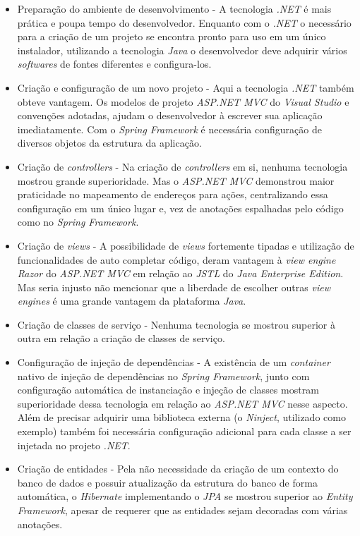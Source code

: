 \documentclass[a4paper,12pt]{article}
\newcommand{\est}[1] {
\textit{#1}}
\newcommand{\sigla}[1] {
\textit{#1}}
\newcommand{\lang}[1] {
\textit{#1}}
\begin{document}
\begin{itemize}
  \item Preparação do ambiente de desenvolvimento - A tecnologia \sigla{.NET} é mais prática e poupa tempo do desenvolvedor. Enquanto com o \sigla{.NET} o necessário para a criação de um projeto se encontra pronto para uso em um único instalador, utilizando a tecnologia \lang{Java} o desenvolvedor deve adquirir vários \est{softwares} de fontes diferentes e configura-los.
  \item Criação e configuração de um novo projeto - Aqui a tecnologia \sigla{.NET} também obteve vantagem. Os modelos de projeto \est{ASP.NET MVC} do \est{Visual Studio} e convenções adotadas, ajudam o desenvolvedor à escrever sua aplicação imediatamente. Com o \est{Spring Framework} é necessária configuração de diversos objetos da estrutura da aplicação.
  \item Criação de \est{controllers} - Na criação de \est{controllers} em si, nenhuma tecnologia mostrou grande superioridade. Mas o \est{ASP.NET MVC} demonstrou maior praticidade no mapeamento de endereços para ações, centralizando essa configuração em um único lugar e, vez de anotações espalhadas pelo código como no \est{Spring Framework}.
  \item Criação de \est{views} - A possibilidade de \est{views} fortemente tipadas e utilização de funcionalidades de auto completar código, deram vantagem à \est{view engine Razor} do \est{ASP.NET MVC} em relação ao \sigla{JSTL} do \est{Java Enterprise Edition}. Mas seria injusto não mencionar que a liberdade de escolher outras \est{view engines} é uma grande vantagem da plataforma \lang{Java}.
  \item Criação de classes de serviço - Nenhuma tecnologia se mostrou superior à outra em relação a criação de classes de serviço.
  \item Configuração de injeção de dependências - A existência de um \est{container} nativo de injeção de dependências no \est{Spring Framework}, junto com configuração automática de instanciação e injeção de classes mostram superioridade dessa tecnologia em relação ao \est{ASP.NET MVC} nesse aspecto. Além de precisar adquirir uma biblioteca externa (o \est{Ninject}, utilizado como exemplo) também foi necessária configuração adicional para cada classe a ser injetada no projeto \sigla{.NET}.
  \item Criação de entidades - Pela não necessidade da criação de um contexto do banco de dados e possuir atualização da estrutura do banco de forma automática, o \est{Hibernate} implementando o \sigla{JPA} se mostrou superior ao \est{Entity Framework}, apesar de requerer que as entidades sejam decoradas com várias anotações.

\end{itemize}
\end{document}
